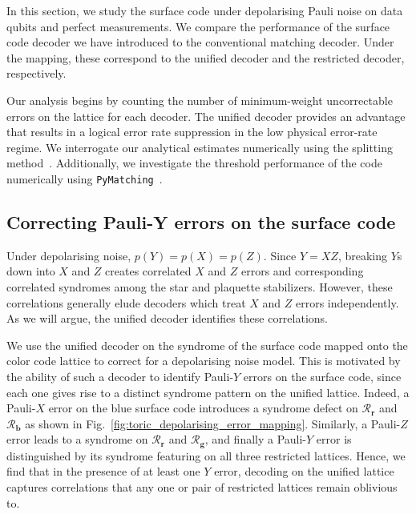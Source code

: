 \documentclass[a4paper,twocolumn,11pt,accepted=2024-12-23]{quantumarticle}
\begin{document}
In this section, we study the surface code under depolarising Pauli noise on data qubits and perfect measurements. We compare the performance of the surface code decoder we have introduced to the conventional matching decoder. Under the mapping, these correspond to the unified decoder and the restricted decoder, respectively. 


Our analysis begins by counting the number of minimum-weight uncorrectable errors on the lattice for each decoder. The unified decoder provides an advantage that results in a logical error rate suppression in the low physical error-rate regime. We interrogate our analytical estimates numerically using the splitting method~\cite{Bravyi_2013}. Additionally, we investigate the threshold performance of the code numerically using \texttt{PyMatching}~\cite{higgott2023sparse}.  


\subsection{\label{ssec:motivation} Correcting Pauli-Y errors on the surface code}

Under depolarising noise, $p(Y)=p(X)=p(Z)$. Since $Y=XZ$, breaking $Y$s down  into $X$ and $Z$ creates correlated $X$ and $Z$ errors and corresponding correlated syndromes among the star and plaquette stabilizers. However, these correlations generally elude decoders which treat $X$ and $Z$ errors independently. As we will argue, the unified decoder identifies these correlations.


We use the unified decoder on the syndrome of the surface code mapped onto the color code lattice to correct for a depolarising noise model. This is motivated by the ability of such a decoder to identify Pauli-$Y$ errors on the surface code, since each one gives rise to a distinct syndrome pattern on the unified lattice. Indeed, a Pauli-$X$ error on the blue surface code introduces a syndrome defect on $\mathcal{R}_{\mathbf{r}}$ and $\mathcal{R}_{\mathbf{b}}$ as shown in Fig.~\ref{fig:toric_depolarising_error_mapping}. Similarly, a Pauli-$Z$ error leads to a syndrome on $\mathcal{R}_{\mathbf{r}}$ and $\mathcal{R}_{\mathbf{g}}$, and finally a Pauli-$Y$ error is distinguished by its syndrome featuring on all three restricted lattices. Hence, we find that in the presence of at least one $Y$ error, decoding on the unified lattice captures correlations that any one or pair of restricted lattices remain oblivious to.
\end{document}
